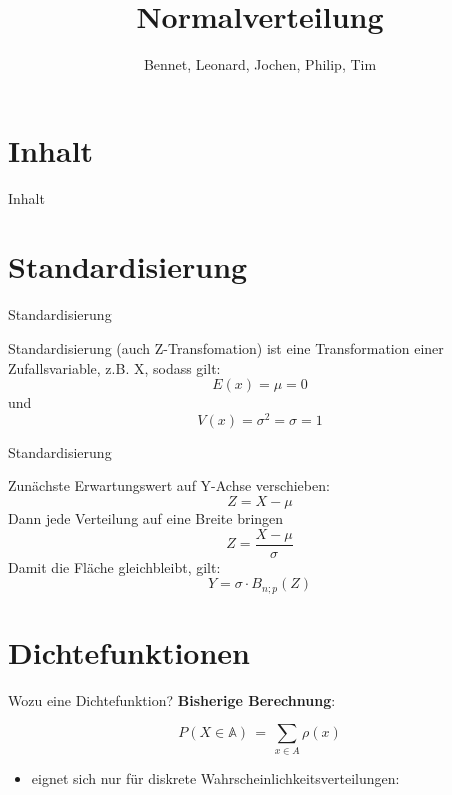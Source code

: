 \documentclass[14pt]{beamer}
\author{Bennet, Leonard, Jochen, Philip, Tim}
\title{Normalverteilung}
\institute{Herder Gymnasium Berlin}
\date{}
\begin{document}
\begin{frame}
 \titlepage
\end{frame}

\section{Inhalt}
\begin{frame}[allowframebreaks]{Inhalt}
 \tableofcontents
\end{frame}

\section{Standardisierung}

\begin{frame} {Standardisierung}

Standardisierung (auch Z-Transfomation) ist eine Transformation einer Zufallsvariable, z.B. X, sodass gilt: $$E(x) = \mu = 0$$ und $$V(x) = \sigma^2 = \sigma = 1$$

\end{frame}

\begin{frame} {Standardisierung}

Zunächste Erwartungswert auf Y-Achse verschieben:
$$ Z = X - \mu $$
Dann jede Verteilung auf eine Breite bringen
$$ Z = \frac{X - \mu}{\sigma} $$
Damit die Fläche gleichbleibt, gilt:
$$ Y = \sigma \cdot B_{n;p}(Z) $$

\end{frame}


\section{Dichtefunktionen}
\begin{frame}{Wozu eine Dichtefunktion?}
\textbf{Bisherige Berechnung}:

{\small $$ P(X \in\mathbb{A}) \, = \, \sum_{x\in A} \rho(x) $$}
\begin{itemize}

\item eignet sich nur für diskrete Wahrscheinlichkeitsverteilungen:

\begin{itemize}
\end{itemize}
\end{itemize}

\end{frame}
\end{document}
